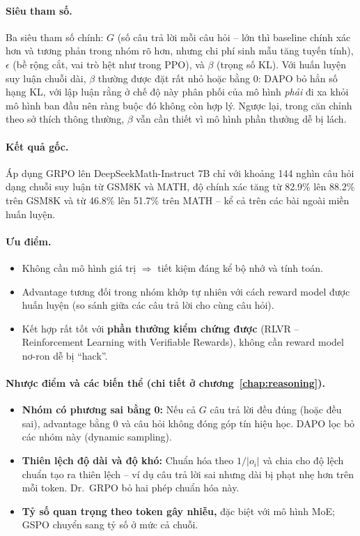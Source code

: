 \paragraph{Siêu tham số.}
Ba siêu tham số chính: $G$ (số câu trả lời mỗi câu hỏi -- lớn thì baseline chính xác hơn và tương phản trong nhóm rõ hơn, nhưng chi phí sinh mẫu tăng tuyến tính), $\epsilon$ (bề rộng cắt, vai trò hệt như trong PPO), và $\beta$ (trọng số KL). Với huấn luyện suy luận chuỗi dài, $\beta$ thường được đặt rất nhỏ hoặc bằng 0: DAPO \cite{yu2025dapo} bỏ hẳn số hạng KL, với lập luận rằng ở chế độ này phân phối của mô hình \emph{phải} đi xa khỏi mô hình ban đầu nên ràng buộc đó không còn hợp lý. Ngược lại, trong căn chỉnh theo sở thích thông thường, $\beta$ vẫn cần thiết vì mô hình phần thưởng dễ bị lách.

\paragraph{Kết quả gốc.} Áp dụng GRPO lên DeepSeekMath-Instruct 7B chỉ với khoảng 144 nghìn câu hỏi dạng chuỗi suy luận từ GSM8K và MATH, độ chính xác tăng từ 82.9\% lên 88.2\% trên GSM8K và từ 46.8\% lên 51.7\% trên MATH -- kể cả trên các bài ngoài miền huấn luyện.

\paragraph{Ưu điểm.}
\begin{itemize}
	\item Không cần mô hình giá trị $\Rightarrow$ tiết kiệm đáng kể bộ nhớ và tính toán.
	\item Advantage tương đối trong nhóm khớp tự nhiên với cách reward model được huấn luyện (so sánh giữa các câu trả lời cho cùng câu hỏi).
	\item Kết hợp rất tốt với \textbf{phần thưởng kiểm chứng được} (RLVR -- Reinforcement Learning with Verifiable Rewards), không cần reward model nơ-ron dễ bị “hack”.
\end{itemize}

\paragraph{Nhược điểm và các biến thể (chi tiết ở chương~\ref{chap:reasoning}).}
\begin{itemize}
	\item \textbf{Nhóm có phương sai bằng 0:} Nếu cả $G$ câu trả lời đều đúng (hoặc đều sai), advantage bằng 0 và câu hỏi không đóng góp tín hiệu học. DAPO \cite{yu2025dapo} lọc bỏ các nhóm này (dynamic sampling).
	\item \textbf{Thiên lệch độ dài và độ khó:} Chuẩn hóa theo $1/|o_i|$ và chia cho độ lệch chuẩn tạo ra thiên lệch -- ví dụ câu trả lời sai nhưng dài bị phạt nhẹ hơn trên mỗi token. Dr.~GRPO \cite{liu2025drgrpo} bỏ hai phép chuẩn hóa này.
	\item \textbf{Tỷ số quan trọng theo token gây nhiễu,} đặc biệt với mô hình MoE; GSPO \cite{zheng2025gspo} chuyển sang tỷ số ở mức cả chuỗi.
\end{itemize}

